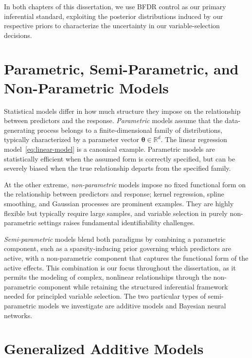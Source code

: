 In both chapters of this dissertation, we use BFDR control as
our primary inferential standard, exploiting the posterior
distributions induced by our respective priors to characterize
the uncertainty in our variable-selection decisions.

\section{Parametric, Semi-Parametric, and Non-Parametric Models}
\label{sec:intro-models}

Statistical models differ in how much structure they impose on the
relationship between predictors and the response. \emph{Parametric}
models assume that the data-generating process belongs to a
finite-dimensional family of distributions, typically characterized
by a parameter vector $\boldsymbol{\theta} \in \mathbb{R}^d$. The
linear regression model~\eqref{eq:linear-model} is a canonical
example. Parametric models are statistically efficient when the
assumed form is correctly specified, but can be severely biased when the true
relationship departs from the specified family.

At the other extreme, \emph{non-parametric} models impose no fixed functional form on the relationship between predictors and response; kernel regression, spline smoothing, and Gaussian processes
are prominent examples. They are highly flexible but typically
require large samples, and variable selection in purely
non-parametric settings raises fundamental identifiability
challenges.

\emph{Semi-parametric} models blend both paradigms by combining a parametric component, 
such as a sparsity-inducing prior governing which predictors are active, 
with a non-parametric component that captures the functional form of the active effects.
This combination is our focus throughout the dissertation, as it
permits the modeling of complex, nonlinear relationships through the non-parametric component 
while retaining the structured inferential framework needed for
principled variable selection.  
The two particular types of semi-parametric models we investigate 
are additive models and Bayesian neural networks.

\section{Generalized Additive Models}
\label{sec:intro-gam}

